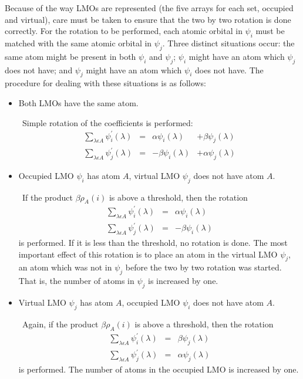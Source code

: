 Because of the way LMOs are represented (the five arrays for each set, occupied
and virtual), care must be taken to ensure that the two by two rotation is done
correctly.  For the rotation to be performed, each atomic orbital in $\psi_i$
must be matched with the same atomic orbital in $\psi_j$.  Three distinct
situations occur: the same atom might be present in both $\psi_i$ and $\psi_j$;
$\psi_i$ might have an atom which $\psi_j$ does not have; and $\psi_j$ might
have an atom which $\psi_i$ does not have. The procedure for dealing with these
situations is as follows:
\begin{itemize}
\item Both LMOs have the same atom.

$\ \ $Simple rotation of the coefficients is performed:
\begin{equation}
\begin{array}{llrr}
\sum_{\lambda\epsilon A} \psi_i^{'}(\lambda)  & = 
& \alpha\psi_i(\lambda) & + \beta\psi_j(\lambda) \\
\sum_{\lambda\epsilon A}\psi_j^{'}(\lambda)  & = 
&-\beta\psi_i(\lambda)  & +\alpha\psi_j(\lambda)
\end{array}
\end{equation}

\item Occupied LMO $\psi_i$ has atom $A$, virtual LMO $\psi_j$ does not 
have atom $A$.

$\ \ $If the product $\beta\rho_A(i)$ is above a threshold, then the rotation
\begin{equation}
\begin{array}{llrr}
\sum_{\lambda\epsilon A} \psi_i^{'}(\lambda)  & =
& \alpha\psi_i(\lambda)  \\
\sum_{\lambda\epsilon A}\psi_j^{'}(\lambda)  & =
&-\beta\psi_i(\lambda)  
\end{array}
\end{equation}
is performed. If it is less than the threshold, no rotation is done.
The most important effect of this rotation is to place an atom in the virtual
LMO $\psi_j$, an atom which was not in $\psi_j$ before the two by two rotation
was started.  That is, the number of atoms in $\psi_j$ is increased by one.

\item Virtual  LMO $\psi_j$ has atom $A$, occupied LMO $\psi_i$ does not 
have atom $A$.

$\ \ $Again, if the product $\beta\rho_A(i)$ is above a threshold, then the rotation
\begin{equation}
\begin{array}{llrr} 
\sum_{\lambda\epsilon A} \psi_i^{'}(\lambda)  & =
&  \beta\psi_j(\lambda) \\
\sum_{\lambda\epsilon A}\psi_j^{'}(\lambda)  & =
&\alpha\psi_j(\lambda)
\end{array}
\end{equation}
is performed.  The number of atoms in the occupied LMO is increased by one.
\end{itemize}

